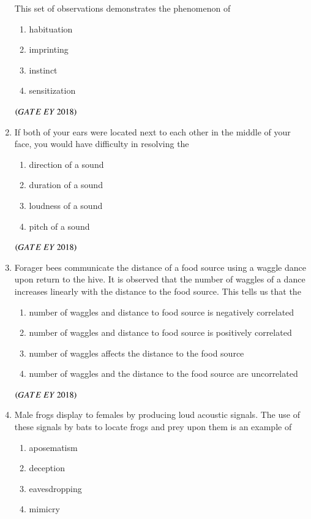 \documentclass[journal]{IEEEtran}
\numberwithin{equation}{enumi}
\numberwithin{figure}{enumi}
\begin{document}
\begin{enumerate}
This set of observations demonstrates the phenomenon of
    \begin{enumerate}
        \item habituation
        \item imprinting
        \item instinct
        \item sensitization
    \end{enumerate}
    \hfill{$\brak{ GATE\ EY\ 2018}$}
    \bigskip
\item If both of your ears were located next to each other in the middle of your face, you
would have difficulty in resolving the
    \begin{enumerate}
        \item direction of a sound
        \item duration of a sound
        \item loudness of a sound 
        \item pitch of a sound
    \end{enumerate}
    \hfill{$\brak{ GATE\ EY\ 2018}$}
    \bigskip
\item Forager bees communicate the distance of a food source using a waggle dance upon
return to the hive. It is observed that the number of waggles of a dance increases
linearly with the distance to the food source. This tells us that the
    \begin{enumerate}
        \item number of waggles and distance to food source is negatively correlated
        \item  number of waggles and distance to food source is positively correlated
        \item number of waggles affects the distance to the food source
        \item number of waggles and the distance to the food source are uncorrelated
    \end{enumerate}
    \hfill{$\brak{ GATE\ EY\ 2018}$}
    \bigskip
\item Male frogs display to females by producing loud acoustic signals. The use of these
signals by bats to locate frogs and prey upon them is an example of
    \begin{enumerate}
        \item aposematism
        \item deception
        \item eavesdropping
        \item mimicry
    \end{enumerate}

\end{enumerate}
\end{document}

